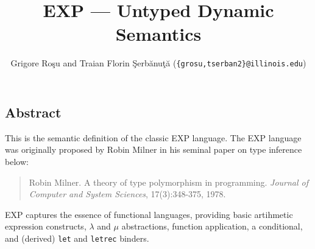 \setlength{\parindent}{1em}
\title{EXP --- Untyped Dynamic Semantics}
\author{Grigore Ro\c{s}u and
        Traian Florin \c{S}erb\u{a}nu\c{t}\u{a}
	(\texttt{\{grosu,tserban2\}@illinois.edu})}

\maketitle

\begin{latexComment}
\section{Abstract}
This is the \K semantic definition of the classic EXP language.
The EXP language was originally proposed by Robin Milner in his
seminal paper on type inference below:
\begin{quote}
Robin Milner. A theory of type polymorphism in programming.
{\em Journal of Computer and System Sciences}, 17(3):348-375, 1978.
\end{quote}
EXP captures the essence of functional languages, providing basic
artihmetic expression constructs, $\lambda$ and $\mu$ abstractions,
function application, a conditional, and (derived) \texttt{let} and
\texttt{letrec} binders.
\end{latexComment}

\vspace*{3ex}


